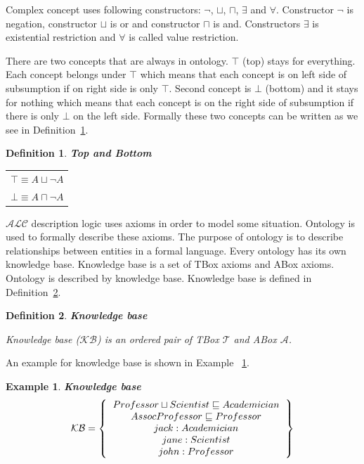 \documentclass[12pt,a4paper]{article}
\newtheorem{definition}{Definition}[subsection]
\newtheorem{example}{Example}[subsection]
\begin{document}
Complex concept uses following constructors: $\neg$, $\sqcup$, $\sqcap$, $\exists$ and $\forall$. Constructor $\neg$ is negation, constructor $\sqcup$ is or and constructor $\sqcap$ is and. Constructors $\exists$ is existential restriction and $\forall$ is called value restriction.

There are two concepts that are always in ontology. $\top$ (top) stays for everything. Each concept belongs under $\top$ which means that each concept is on left side of subsumption if on right side is only $\top$. Second concept is $\bot$ (bottom) and it stays for nothing which means that each concept is on the right side of subsumption if there is only $\bot$ on the left side. Formally these two concepts can be written as we see in Definition~\ref{def:topBottom}.

\begin{definition}{\textbf{Top and Bottom}}
	\label{def:topBottom}
	
	\begin{table}[H]
		\centering
		\begin{tabular}{c}
			$ \top \equiv A \sqcup \neg A $ \\
			\addlinespace[0.4cm]
			$ \bot \equiv A \sqcap \neg A $
		\end{tabular}
	\end{table}
\end{definition}

$\mathcal{ALC}$ description logic uses axioms in order to model some situation. Ontology \citep{staabHandbookOntology} is used to formally describe these axioms. The purpose of ontology is to describe relationships between entities in a formal language. Every ontology has its own knowledge base. Knowledge base is a set of TBox axioms and ABox axioms. Ontology is described by knowledge base. Knowledge base is defined in Definition~\ref{def:knowledgeBase}.

\begin{definition}{\textbf{Knowledge base}}
	\label{def:knowledgeBase}
	
	Knowledge base ($\mathcal{KB}$) is an ordered pair of \textit{TBox} $\mathcal{T}$ and \textit{ABox} $\mathcal{A}$.
\end{definition}

An example for knowledge base is shown in Example ~\ref{example:knowledgeBase}.

\begin{example}{\textbf{Knowledge base}}
	\label{example:knowledgeBase}
	\[ 
	\mathcal{KB} = \left\{
	\begin{tabular}{c c}
	$Professor \sqcup Scientist \sqsubseteq Academician$ \\
	$AssocProfessor \sqsubseteq Professor$ \\
	$jack : Academician$ \\
	$jane : Scientist$ \\
	$john : Professor$ \\	
	\end{tabular}
	\right \}
	\]
\end{example}
\end{document}
